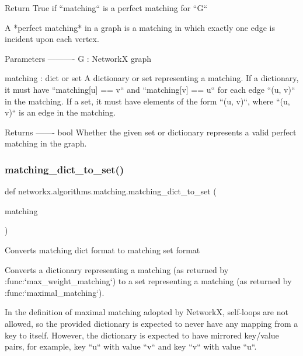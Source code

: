 \begin{DoxyVerb}Return True if ``matching`` is a perfect matching for ``G``

A *perfect matching* in a graph is a matching in which exactly one edge
is incident upon each vertex.

Parameters
----------
G : NetworkX graph

matching : dict or set
    A dictionary or set representing a matching. If a dictionary, it
    must have ``matching[u] == v`` and ``matching[v] == u`` for each
    edge ``(u, v)`` in the matching. If a set, it must have elements
    of the form ``(u, v)``, where ``(u, v)`` is an edge in the
    matching.

Returns
-------
bool
    Whether the given set or dictionary represents a valid perfect
    matching in the graph.\end{DoxyVerb}
 \mbox{\label{namespacenetworkx_1_1algorithms_1_1matching_a4ae567c564e570b5119670f9b48aeac2}} 
\subsubsection{\texorpdfstring{matching\+\_\+dict\+\_\+to\+\_\+set()}{matching\_dict\_to\_set()}}
{\footnotesize\ttfamily def networkx.\+algorithms.\+matching.\+matching\+\_\+dict\+\_\+to\+\_\+set (\begin{DoxyParamCaption}\item[{}]{matching }\end{DoxyParamCaption})}

\begin{DoxyVerb}Converts matching dict format to matching set format

Converts a dictionary representing a matching (as returned by
:func:`max_weight_matching`) to a set representing a matching (as
returned by :func:`maximal_matching`).

In the definition of maximal matching adopted by NetworkX,
self-loops are not allowed, so the provided dictionary is expected
to never have any mapping from a key to itself. However, the
dictionary is expected to have mirrored key/value pairs, for
example, key ``u`` with value ``v`` and key ``v`` with value ``u``.\end{DoxyVerb}
 \mbox{\label{namespacenetworkx_1_1algorithms_1_1matching_ae7d48a6d283dcd1068803cd7df79aea3}} 

